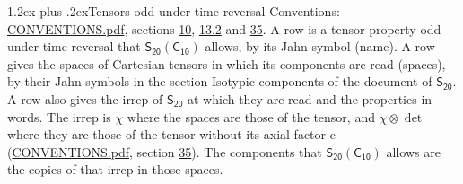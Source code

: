 \documentclass[10pt,a4paper]{article}
\makeatletter
\renewcommand\section{\@startsection{section}{1}{\z@}{-3ex plus -1ex minus -.2ex}%
  {1.2ex plus .2ex}{\normalfont\large\sffamily\bfseries\color{parttitle}}}
\numberwithin{equation}{section}
\newcommand{\grp}[1]{\mathsf{#1}}
\newcommand{\irrprod}{\otimes}
\makeatother
\begin{document}
\section{Tensors odd under time reversal}\label{s:time_odd}
Conventions: \href{../../CONVENTIONS.pdf}{CONVENTIONS.pdf}, sections \href{../../../rotation/CONVENTIONS.pdf\#conv.10}{10}, \href{../../../rotation/CONVENTIONS.pdf\#conv.13.2}{13.2} and \href{../../CONVENTIONS.pdf\#conv.35}{35}.
\leavevmode\label{n:head.name.property}A row is a tensor property odd under time reversal that $\grp{S_{20}}(\grp{C_{10}})$ allows, by its Jahn symbol (name). \label{n:head.spaces}A row gives the spaces of Cartesian tensors in which its components are read (spaces), by their Jahn symbols in the section Isotypic components of the document of \href{../../../rotation/data/pdf/S20.pdf}{$\grp{S_{20}}$}. \label{n:head.properties}A row also gives the irrep of $\grp{S_{20}}$ at which they are read and the properties in words. The irrep is $\chi$ where the spaces are those of the tensor, and $\chi \irrprod \det$ where they are those of the tensor without its axial factor e (\href{../../CONVENTIONS.pdf}{CONVENTIONS.pdf}, section \href{../../CONVENTIONS.pdf\#conv.35}{35}). The components that $\grp{S_{20}}(\grp{C_{10}})$ allows are the copies of that irrep in those spaces.
\end{document}
